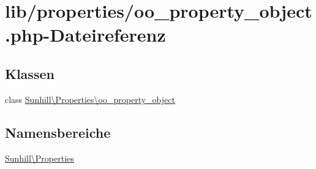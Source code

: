 \hypertarget{oo__property__object_8php}{}\section{lib/properties/oo\+\_\+property\+\_\+object.php-\/\+Dateireferenz}
\label{oo__property__object_8php}
\subsection*{Klassen}
\begin{DoxyCompactItemize}
\item 
class \hyperlink{classSunhill_1_1Properties_1_1oo__property__object}{Sunhill\textbackslash{}\+Properties\textbackslash{}oo\+\_\+property\+\_\+object}
\end{DoxyCompactItemize}
\subsection*{Namensbereiche}
\begin{DoxyCompactItemize}
\item 
 \hyperlink{namespaceSunhill_1_1Properties}{Sunhill\textbackslash{}\+Properties}
\end{DoxyCompactItemize}
